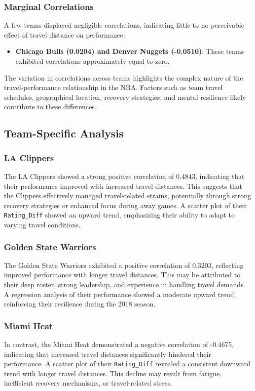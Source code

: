 \documentclass[12pt]{article}
\begin{document}
\subsubsection*{Marginal Correlations}
A few teams displayed negligible correlations, indicating little to no perceivable effect of travel distance on performance:
\begin{itemize}
    \item \textbf{Chicago Bulls (0.0204) and Denver Nuggets (-0.0510)}: These teams exhibited correlations approximately equal to zero.
\end{itemize}

The variation in correlations across teams highlights the complex nature of the travel-performance relationship in the NBA. Factors such as team travel schedules, geographical location, recovery strategies, and mental resilience likely contribute to these differences.

\subsection{Team-Specific Analysis}

\subsubsection*{LA Clippers}
The LA Clippers showed a strong positive correlation of 0.4843, indicating that their performance improved with increased travel distances. This suggests that the Clippers effectively managed travel-related strains, potentially through strong recovery strategies or enhanced focus during away games. A scatter plot of their \texttt{Rating\_Diff} showed an upward trend, emphasizing their ability to adapt to varying travel conditions.

\subsubsection*{Golden State Warriors}
The Golden State Warriors exhibited a positive correlation of 0.3203, reflecting improved performance with longer travel distances. This may be attributed to their deep roster, strong leadership, and experience in handling travel demands. A regression analysis of their performance showed a moderate upward trend, reinforcing their resilience during the 2018 season.

\subsubsection*{Miami Heat}
In contrast, the Miami Heat demonstrated a negative correlation of -0.4675, indicating that increased travel distances significantly hindered their performance. A scatter plot of their \texttt{Rating\_Diff} revealed a consistent downward trend with longer travel distances. This decline may result from fatigue, inefficient recovery mechanisms, or travel-related stress.
\end{document}
